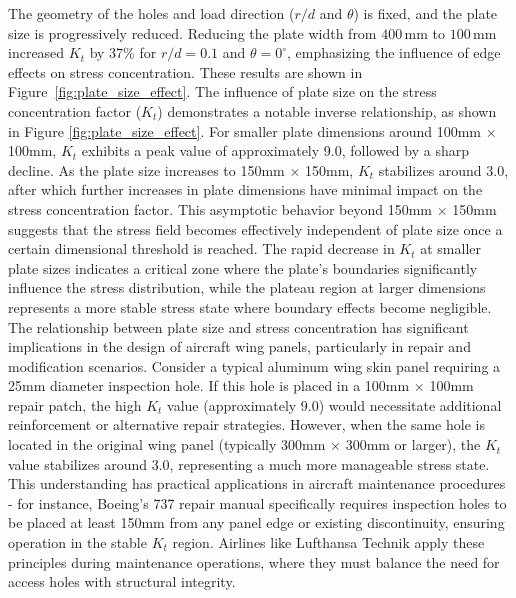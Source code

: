 \documentclass[a4paper,11pt]{article}
\begin{document}
  \FloatBarrier
The geometry of the holes and load direction (\(r/d\) and \(\theta\)) is fixed, and the plate size is progressively reduced. Reducing the plate width from \(400\, \mathrm{mm}\) to \(100 \, \mathrm{mm}\) increased \(K_t\) by 37\% for \(r/d = 0.1\) and \(\theta = 0^\circ\), emphasizing the influence of edge effects on stress concentration. These results are shown in Figure~\ref{fig:plate_size_effect}. The influence of plate size on the stress concentration factor ($K_t$) demonstrates a notable inverse relationship, as shown in Figure \ref{fig:plate_size_effect}. For smaller plate dimensions around 100mm $\times$ 100mm, $K_t$ exhibits a peak value of approximately 9.0, followed by a sharp decline. As the plate size increases to 150mm $\times$ 150mm, $K_t$ stabilizes around 3.0, after which further increases in plate dimensions have minimal impact on the stress concentration factor. This asymptotic behavior beyond 150mm $\times$ 150mm suggests that the stress field becomes effectively independent of plate size once a certain dimensional threshold is reached. The rapid decrease in $K_t$ at smaller plate sizes indicates a critical zone where the plate's boundaries significantly influence the stress distribution, while the plateau region at larger dimensions represents a more stable stress state where boundary effects become negligible. The relationship between plate size and stress concentration has significant implications in the design of aircraft wing panels, particularly in repair and modification scenarios. Consider a typical aluminum wing skin panel requiring a 25mm diameter inspection hole. If this hole is placed in a 100mm $\times$ 100mm repair patch, the high $K_t$ value (approximately 9.0) would necessitate additional reinforcement or alternative repair strategies. However, when the same hole is located in the original wing panel (typically 300mm $\times$ 300mm or larger), the $K_t$ value stabilizes around 3.0, representing a much more manageable stress state. This understanding has practical applications in aircraft maintenance procedures - for instance, Boeing's 737 repair manual \cite{boeing_737_overhaul} specifically requires inspection holes to be placed at least 150mm from any panel edge or existing discontinuity, ensuring operation in the stable $K_t$ region. Airlines like Lufthansa Technik \cite{lufthansa_predictive_maintenance} apply these principles during maintenance operations, where they must balance the need for access holes with structural integrity. 
\vspace{-10pt}
\end{document}
